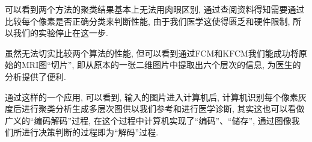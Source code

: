 \documentclass[lang=cn,11pt]{elegantpaper}
\begin{document}
可以看到两个方法的聚类结果基本上无法用肉眼区别, 通过查阅资料得知需要通过比较每个像素是否正确分类来判断性能, 由于我们医学这使得匮乏和硬件限制, 所以我们的实验停止在这一步. 

虽然无法切实比较两个算法的性能, 但可以看到通过FCM和KFCM我们能成功将原始的MRI图“切片”, 即从原本的一张二维图片中提取出六个层次的信息, 为医生的分析提供了便利. 

通过这样的一个应用, 可以看到, 输入的图片进入计算机后, 计算机识别每个像素灰度后进行聚类分析生成多层次图供以我们参考和进行医学诊断, 其实这也可以看做广义的“编码解码”过程, 在这个过程中计算机实现了“编码”、“储存”, 通过图像我们所进行决策判断的过程即为“解码”过程. 


\newpage
\nocite{*}



\end{document}

